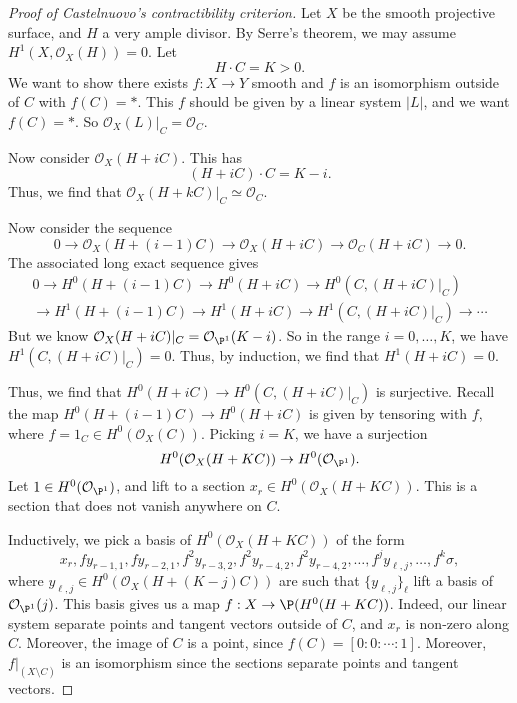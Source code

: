 \documentclass[a4paper]{article}
\begin{document}
\begin{proof}[Proof of Castelnuovo's contractibility criterion]
  Let $X$ be the smooth projective surface, and $H$ a very ample divisor. By Serre's theorem, we may assume $H^1(X, \mathcal{O}_X(H)) = 0$. Let
  \[
    H \cdot C = K > 0.
  \]
  We want to show there exists $f: X \to Y$ smooth and $f$ is an isomorphism outside of $C$ with $f(C) = *$. This $f$ should be given by a linear system $|L|$, and we want $f(C) = *$. So $\mathcal{O}_X(L)|_C = \mathcal{O}_C$.

  Now consider $\mathcal{O}_X(H + iC)$. This has
  \[
    (H + iC) \cdot C = K - i.
  \]
  Thus, we find that $\mathcal{O}_X(H + kC)|_C \simeq \mathcal{O}_C$. 

  Now consider the sequence
  \[
    0 \to \mathcal{O}_X (H + (i - 1) C) \to \mathcal{O}_X(H + iC) \to \mathcal{O}_C(H + iC) \to 0.
  \]
  The associated long exact sequence gives
  \begin{multline*}
    0 \to H^0(H + (i - 1)C) \to H^0(H + iC) \to H^0(C, (H + iC)|_C)\\
    \to H^1(H + (i - 1)C) \to H^1(H + iC) \to H^1(C, (H + iC)|_C) \to \cdots
  \end{multline*}
  But we know $\mathcal{O}_X(H + iC)|_C = \mathcal{O}_{\P^1}(K - i)$. So in the range $i = 0, \ldots, K$, we have $H^1(C, (H + iC)|_C) = 0$. Thus, by induction, we find that $H^1(H + iC) = 0$.

  Thus, we find that $H^0(H + iC) \to H^0(C, (H + iC)|_C)$ is surjective. Recall the map $H^0(H + (i - 1)C) \to H^0(H + iC)$ is given by tensoring with $f$, where $f = 1_C \in H^0(\mathcal{O}_X(C))$. Picking $i = K$, we have a surjection
  \[
    H^0(\mathcal{O}_X(H + KC)) \to H^0(\mathcal{O}_{\P^1}).
  \]
  Let $1 \in H^0(\mathcal{O}_{\P^1})$, and lift to a section $x_r \in H^0(\mathcal{O}_X(H + KC))$. This is a section that does not vanish anywhere on $C$.

  Inductively, we pick a basis of $H^0(\mathcal{O}_X(H + KC))$ of the form
  \[
    x_r, f y_{r - 1, 1}, f y_{r - 2, 1}, f^2 y_{r - 3, 2}, f^2 y_{r - 4, 2}, f^2 y_{r - 4, 2}, \ldots, f^j y_{\ell, j}, \ldots, f^k \sigma,
  \]
  where $y_{\ell, j}  \in H^0(\mathcal{O}_X(H + (K - j)C))$ are such that $\{y_{\ell, j}\}_\ell$ lift a basis of $\mathcal{O}_{\P^1}(j)$. This basis gives us a map $f: X \to \P(H^0(H + KC))$. Indeed, our linear system separate points and tangent vectors outside of $C$, and $x_r$ is non-zero along $C$. Moreover, the image of $C$ is a point, since $f(C) = [0:0:\cdots :1]$. Moreover, $f|_{(X \setminus C)}$ is an isomorphism since the sections separate points and tangent vectors.


\end{proof}
\end{document}
